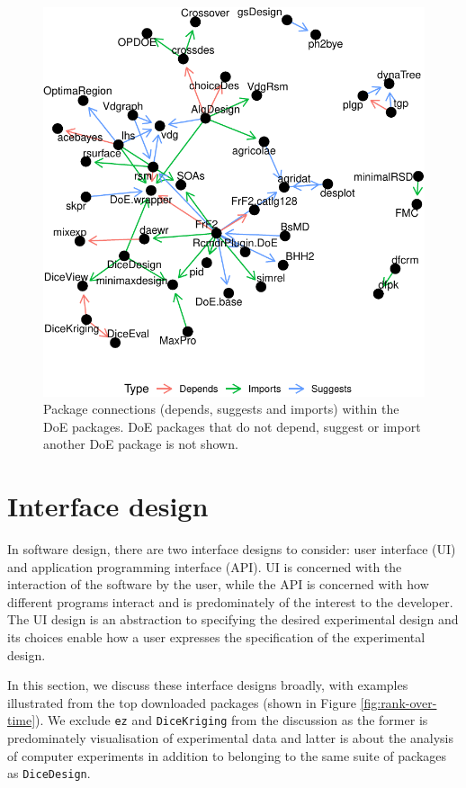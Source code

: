 \documentclass{article}
\begin{document}
\begin{figure}[htbp]

{\centering \includegraphics{figures/plot-doe-network-1} 

}

\caption{Package connections (depends, suggests and imports) within the DoE packages. DoE packages that do not depend, suggest or import another DoE package is not shown.}\label{fig:plot-doe-network}
\end{figure}

\hypertarget{design}{%
\section{Interface design}\label{design}}

In software design, there are two interface designs to consider: user
interface (UI) and application programming interface (API). UI is
concerned with the interaction of the software by the user, while the
API is concerned with how different programs interact and is
predominately of the interest to the developer. The UI design is an
abstraction to specifying the desired experimental design and its
choices enable how a user expresses the specification of the
experimental design.

In this section, we discuss these interface designs broadly, with
examples illustrated from the top downloaded packages (shown in Figure
\ref{fig:rank-over-time}). We exclude \texttt{ez} and
\texttt{DiceKriging} from the discussion as the former is predominately
visualisation of experimental data and latter is about the analysis of
computer experiments in addition to belonging to the same suite of
packages as \texttt{DiceDesign}.
\end{document}
